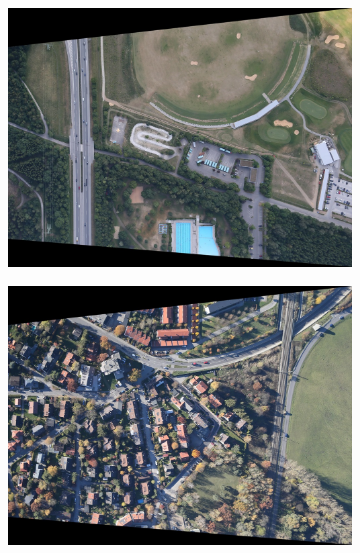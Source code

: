 \begin{figure}[tbp]
    \centering
       \begin{subfigure}[b]{0.243\textwidth}
           \centering
           \includegraphics[width=\textwidth]{figures_dataset/container_org_air.jpg}
       \end{subfigure}
       \hfill
       \begin{subfigure}[b]{0.243\textwidth}  
           \centering 
           \includegraphics[width=\textwidth]{figures_dataset/eichenau_org_air.jpg}
       \end{subfigure}
       \hfill
       \begin{subfigure}[b]{0.243\textwidth}  

\end{subfigure}
\end{figure}
